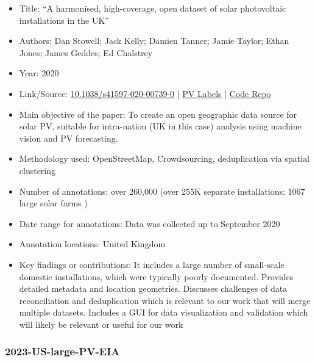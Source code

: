 \begin{itemize}
    \item Title: ``A harmonised, high-coverage, open dataset of solar photovoltaic installations in the UK''
    \item Authors: Dan Stowell; Jack Kelly; Damien Tanner; Jamie Taylor; Ethan Jones; James Geddes; Ed Chalstrey
    \item Year: 2020
    \item Link/Source: \href{https://doi.org/10.1038/s41597-020-00739-0}{10.1038/s41597-020-00739-0} | 
    \href{https://zenodo.org/records/4059881}{PV Labels} |
    \href{https://github.com/openclimatefix/solar-power-mapping-data}{Code Repo}
    \item Main objective of the paper: To create an open geographic data source for solar PV, suitable for intra-nation (UK in this case) analysis using machine vision and PV forecasting. 
    \item Methodology used: OpenStreetMap, Crowdsourcing, deduplication via spatial clustering
    \item Number of annotations: over 260,000 (over 255K separate installations; 1067 large solar farms )
    \item Date range for annotations: Data was collected up to September 2020 
    \item Annotation locations: United Kingdom
    \item Key findings or contributions: It includes a large number of small-scale domestic installations, which were typically poorly documented. 
    Provides detailed metadata and location geometries. 
    Discusses challenges of data reconciliation and deduplication which is relevant to our work that will merge multiple datasets.
    Includes a GUI for data visualization and validation which will likely be relevant or useful for our work
\end{itemize}

\subsubsection{2023-US-large-PV-EIA}

